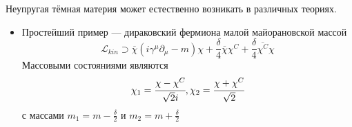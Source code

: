 Неупругая тёмная материя может естественно возникать в различных теориях.
\begin{itemize}
	\item Простейший пример --- дираковский фермиона малой майорановской массой
	\begin{equation*}
		\mathcal{L}_{kin} \supset \overline{\chi}( i\gamma^{\mu} \partial_{\mu} - m)\chi + 
		\frac{\delta}{4} \overline{\chi} \chi^C + \frac{\delta}{4} \overline{\chi^C} \chi %
	\end{equation*}
	Массовыми состояниями являются 
	\begin{eqnarray*}
		\chi_1 = \cfrac{\chi - \chi^C}{\sqrt{2} i} 
		,\chi_2 = \cfrac{\chi+ \chi^C}{\sqrt{2}}
	\end{eqnarray*}
	с массами $m_1 = m - \frac{\delta}{2}$ и  $m_2 = m + \frac{\delta}{2}$
\end{itemize}
